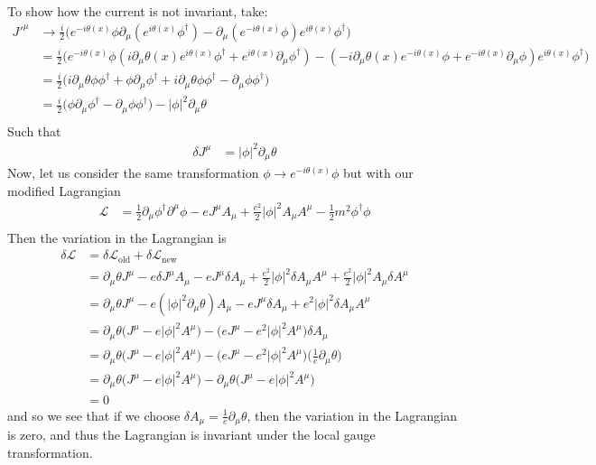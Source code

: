 \documentclass[12pt]{article}
\newcommand{\delmu}{\partial_{\mu}}
\newcommand{\delMu}{\partial^{\mu}}
\newcommand{\+}{\dagger}
\begin{document}
To show how the current is not invariant, take:
\begin{align*}
    J'^{\mu} &\to \frac{i}{2}\big(e^{-i\theta(x)}\phi \delmu
    (e^{i\theta(x)}\phi^{\+}) - \delmu (e^{-i\theta(x)}\phi)e^{i\theta(x)}\phi^{\+} \big) \\
            &= \frac{i}{2} \big(
                e^{-i\theta(x)}\phi(i\delmu\theta(x)e^{i\theta(x)}\phi^{\+} + 
                e^{i\theta(x)}\delmu\phi^{\+}) -
                (-i\delmu\theta(x)e^{-i\theta(x)}\phi +
                e^{-i\theta(x)}\delmu\phi)e^{i\theta(x)}\phi^{\+}
            \big) \\
            &= \frac{i}{2} \big(
                i\delmu\theta\phi\phi^{\+} + \phi\delmu\phi^{\+} +
                i\delmu\theta\phi\phi^{\+} - \delmu\phi\phi^{\+}
            \big) \\
            &= \frac{i}{2}\big(\phi\delmu\phi^{\+} - \delmu\phi\phi^{\+}\big) 
            - |\phi|^2\delmu\theta \\
\end{align*}
Such that
\begin{align*}
    \delta J^{\mu} &= |\phi|^2\delmu\theta
\end{align*}
Now, let us consider the same transformation $\phi \to e^{-i\theta(x)}\phi$ but with our 
modified Lagrangian
\begin{align*}
    \mathcal{L} &= \frac{1}{2}\delmu\phi^{\+}\delMu\phi - eJ^{\mu}A_{\mu} + \frac{e^2}{2}
    |\phi|^2A_{\mu}A^{\mu} - \frac{1}{2}m^2\phi^{\+}\phi  \\
\end{align*}
Then the variation in the Lagrangian is
\begin{align*}
    \delta\mathcal{L} &= \delta \mathcal{L}_{\text{old}} + \delta \mathcal{L}_{\text{new}} \\
    &= \delmu\theta  J^{\mu} - e \delta J^{\mu} A_{\mu} - e J^{\mu} \delta A_{\mu} + 
    \frac{e^2}{2} |\phi|^2 \delta A_{\mu}A^{\mu} + \frac{e^2}{2} |\phi|^2 A_{\mu} \delta A^{\mu} \\
    &= \delmu\theta  J^{\mu} - e (|\phi|^2 \delmu\theta) A_{\mu} - e J^{\mu} \delta A_{\mu} + 
    e^2 |\phi|^2 \delta A_{\mu}A^{\mu} \\
    &= \delmu\theta \big(J^{\mu} -e|\phi|^2 A^{\mu} \big) - \big(eJ^{\mu} - e^2
    |\phi|^2 A^{\mu} \big) \delta A_{\mu} \\
    &= \delmu\theta \big(J^{\mu} -e|\phi|^2 A^{\mu} \big) - \big(eJ^{\mu} - e^2
    |\phi|^2 A^{\mu} \big) \Big(\frac{1}{e} \delmu\theta  \Big) \\
    &= \delmu\theta \big(J^{\mu} -e|\phi|^2 A^{\mu} \big) - \delmu\theta\big(J^{\mu} - e
    |\phi|^2 A^{\mu} \big)\\
    &= 0
\end{align*}
and so we see that if we choose $\delta A_{\mu} = \frac{1}{e}\delmu\theta$, then
the variation in the Lagrangian is zero, and thus the Lagrangian is invariant
under the local gauge transformation.
\end{document}
